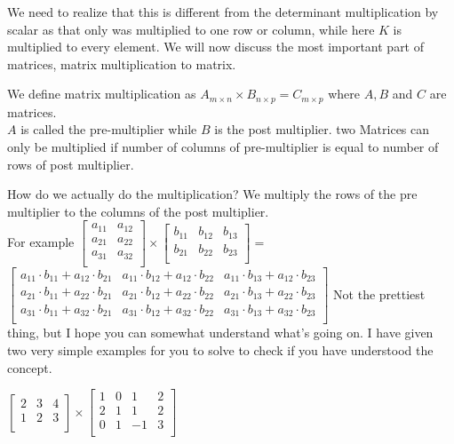 We need to realize that this is different from the determinant multiplication by scalar as that only was multiplied to one row or column, while here $K$ is multiplied to every element. We will now discuss the most important part of matrices, matrix multiplication to matrix.\\
\begin{definition}
    We define matrix multiplication as $A_{m \times n} \times B_{n \times p}= C_{m \times p}$ where $A,B$ and $C$ are matrices.\\
    $A$ is called the pre-multiplier while $B$ is the post multiplier. two Matrices can only be multiplied  if number of columns of
pre-multiplier is equal to number of rows of post multiplier.
\end{definition}
How do we actually do the multiplication? We multiply the rows of the pre multiplier to the columns of the post multiplier.\\
For example $\begin{bmatrix}
    a_{11} & a_{12} \\
    a_{21} & a_{22} \\
    a_{31} & a_{32}\\
\end{bmatrix} \times \begin{bmatrix}
    b_{11} & b_{12} & b_{13}\\
    b_{21} & b_{22} & b_{23}\\
\end{bmatrix} =
    $
    $\begin{bmatrix}
    a_{11} \cdot b_{11} + a_{12} \cdot b_{21} & a_{11} \cdot b_{12} + a_{12} \cdot b_{22} & a_{11} \cdot b_{13} + a_{12} \cdot b_{23} \\
    a_{21} \cdot b_{11} + a_{22} \cdot b_{21} & a_{21} \cdot b_{12} + a_{22} \cdot b_{22} & a_{21} \cdot b_{13} + a_{22} \cdot b_{23} \\
    a_{31} \cdot b_{11} + a_{32} \cdot b_{21} & a_{31} \cdot b_{12} + a_{32} \cdot b_{22} & a_{31} \cdot b_{13} + a_{32} \cdot b_{23} \\
\end{bmatrix}$
Not the prettiest thing, but I hope you can somewhat understand what's going on.  I have given two very simple examples for you to solve to check if you have understood the concept.\\
\begin{example}
    $\begin{bmatrix}
        2 & 3 & 4\\
        1 & 2 & 3\\
    \end{bmatrix} \times \begin{bmatrix}
        1 & 0 & 1 & 2\\
        2 & 1 & 1 & 2\\
        0 & 1 & -1 & 3\\
    \end{bmatrix}$
\end{example}
